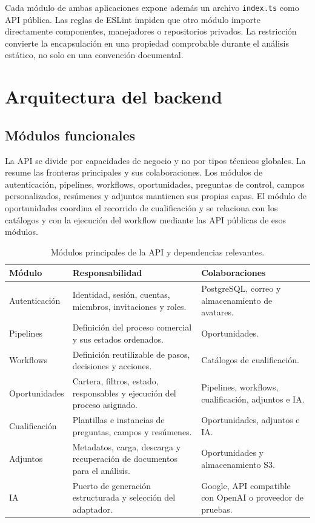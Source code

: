 Cada módulo de ambas aplicaciones expone además un archivo \texttt{index.ts}
como API pública. Las reglas de ESLint impiden que otro módulo importe
directamente componentes, manejadores o repositorios privados. La restricción
convierte la encapsulación en una propiedad comprobable durante el análisis
estático, no solo en una convención documental.

\section{Arquitectura del backend}
\label{sec:backend-architecture}

\subsection{Módulos funcionales}

La API se divide por capacidades de negocio y no por tipos técnicos globales.
La  resume las fronteras principales y sus
colaboraciones.
Los módulos de autenticación, pipelines, workflows, oportunidades, preguntas
de control, campos personalizados, resúmenes y adjuntos mantienen sus propias
capas. El módulo de oportunidades coordina el recorrido de cualificación y se
relaciona con los catálogos y con la ejecución del workflow mediante las API
públicas de esos módulos.

\begin{table}[htbp]
  \centering
  \caption{Módulos principales de la API y dependencias relevantes.}
  \label{tab:backend-modules}
  \begin{tabular}{L{0.22\textwidth} L{0.40\textwidth} L{0.29\textwidth}}
    \toprule
    \textbf{Módulo} & \textbf{Responsabilidad} & \textbf{Colaboraciones} \\
    \midrule
    Autenticación & Identidad, sesión, cuentas, miembros, invitaciones y roles. & PostgreSQL, correo y almacenamiento de avatares. \\
    Pipelines & Definición del proceso comercial y sus estados ordenados. & Oportunidades. \\
    Workflows & Definición reutilizable de pasos, decisiones y acciones. & Catálogos de cualificación. \\
    Oportunidades & Cartera, filtros, estado, responsables y ejecución del proceso asignado. & Pipelines, workflows, cualificación, adjuntos e IA. \\
    Cualificación & Plantillas e instancias de preguntas, campos y resúmenes. & Oportunidades, adjuntos e IA. \\
    Adjuntos & Metadatos, carga, descarga y recuperación de documentos para el análisis. & Oportunidades y almacenamiento S3. \\
    IA & Puerto de generación estructurada y selección del adaptador. & Google, API compatible con OpenAI o proveedor de pruebas. \\
    \bottomrule
  \end{tabular}
\end{table}

